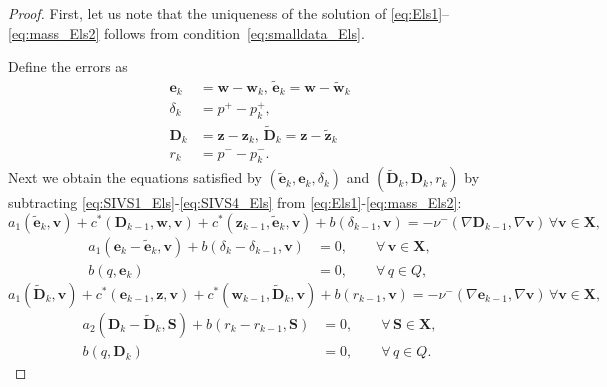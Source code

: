 \documentclass[3p]{elsarticle}
\def\numinus{\nu^{-}}
\def\pplus{p^{+}}
\def\pminus{p^{-}}
\def\V#1{\mathbf{#1}}
\def\Vt#1{\mathbf{\tilde{#1}}}
\def\VX{\mathbf{X}}
\begin{document}
\begin{proof}
First, let us note that the uniqueness of the solution of \eqref{eq:Els1}--\eqref{eq:mass_Els2} follows from condition~\eqref{eq:smalldata_Els}.

Define the errors as 
\begin{equation}
    \label{eq:err0_Els}
    \begin{aligned}
\V{e}_k & =\V{w}-\V{w}_k, \, \Vt{e}_k=\V{w}-\Vt{w}_k \\
\delta_k & = \pplus-\pplus_k, \\
\V{D}_k & =\V{z}-\V{z}_k, \, \Vt{D}_k=\V{z}-\Vt{z}_k \\
r_k & = \pminus-\pminus_k.
    \end{aligned}
\end{equation}
Next we obtain the equations satisfied by $(\Vt{e}_k,\V{e}_k,\delta_k)$ and $(\Vt{D}_k,\V{D}_k,r_k)$ by subtracting \eqref{eq:SIVS1_Els}-\eqref{eq:SIVS4_Els} from \eqref{eq:Els1}-\eqref{eq:mass_Els2}:
\begin{equation}\label{eq:err1_Els}
a_1(\Vt{e}_{k},\V{v})
+ c^*(\V{D}_{k-1}, \V{w}, \V{v}) + c^*(\V{z}_{k-1}, \Vt{e}_k, \V{v})
+ b(\delta_{k-1},\V{v}) = -\numinus(\nabla \V{D}_{k-1},\nabla \V{v}) 
\, \forall \V{v} \in \VX,
\end{equation}
\begin{equation}\label{eq:err2_Els}
\begin{aligned}
a_1(\V{e}_{k} - \Vt{e}_{k}, \V{v}) + b(\delta_k-\delta_{k-1},\V{v}) & = 0, \qquad \forall \, \V{v} \in \V{X}, \\
b(q, \V{e}_{k}) & = 0, \qquad \forall \, q \in Q,
\end{aligned}
\end{equation}
\begin{equation}\label{eq:err3_Els}
a_1(\Vt{D}_{k},\V{v})
+ c^*(\V{e}_{k-1}, \V{z}, \V{v}) + c^*(\V{w}_{k-1}, \Vt{D}_k, \V{v})
+ b(r_{k-1},\V{v}) = -\numinus(\nabla \V{e}_{k-1},\nabla \V{v})\, \forall \V{v} \in \VX,
\end{equation}
\begin{equation}\label{eq:err4_Els}
\begin{aligned}
a_2(\V{D}_{k} - \Vt{D}_{k}, \V{S}) + b(r_k-r_{k-1},\V{S}) & = 0, \qquad \forall \, \V{S} \in \V{X}, \\
b(q, \V{D}_{k}) & = 0, \qquad \forall \, q \in Q.
\end{aligned}
\end{equation}

\end{proof}
\end{document}
